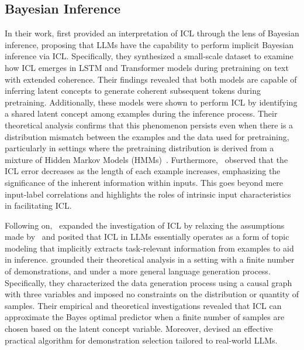 \subsection{Bayesian Inference}
In their work, \citet{Xie2021AnEO} first provided an interpretation of ICL through the lens of Bayesian inference, proposing that LLMs have the capability to perform implicit Bayesian inference via ICL.
Specifically, they synthesized a small-scale dataset to examine how ICL emerges in LSTM and Transformer models during pretraining on text with extended coherence. 
Their findings revealed that both models are capable of inferring latent concepts to generate coherent subsequent tokens during pretraining. Additionally, these models were shown to perform ICL by identifying a shared latent concept among examples during the inference process. 
Their theoretical analysis confirms that this phenomenon persists even when there is a distribution mismatch between the examples and the data used for pretraining,  particularly in settings where the pretraining distribution is derived from a mixture of Hidden Markov Models (HMMs)~\cite{Baum1966StatisticalIF}. 
Furthermore,~\citet{Xie2021AnEO} observed that the ICL error decreases as the length of each example increases, emphasizing the significance of the inherent information within inputs. This goes beyond mere input-label correlations and highlights the roles of intrinsic input characteristics in facilitating ICL.

Following on,~\citet{Wang2023LargeLM} expanded the investigation of ICL by relaxing the assumptions made by~\citet{Xie2021AnEO} and posited that ICL in LLMs essentially operates as a form of topic modeling that implicitly extracts task-relevant information from examples to aid in inference.
\citet{Wang2023LargeLM} grounded their theoretical analysis in a setting with a finite number of demonstrations, and under a more general language generation process. 
Specifically, they characterized the data generation process using a causal graph with three variables and imposed no constraints on the distribution or quantity of samples. Their empirical and theoretical investigations revealed that ICL can approximate the Bayes optimal predictor when a finite number of samples are chosen based on the latent concept variable.
Moreover, \citet{Wang2023LargeLM} devised an effective practical algorithm for demonstration selection tailored to real-world LLMs. 

